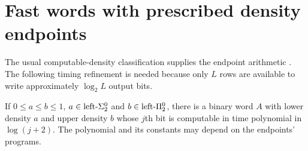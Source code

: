 \section{Fast words with prescribed density endpoints}\label{sec:words}
The usual computable-density classification supplies the endpoint
arithmetic \cite{density}. The following timing refinement is needed
because only $L$ rows are available to write approximately $\log_2 L$
output bits.

\begin{lemma}\label{lem:word}
If $0\leq a\leq b\leq1$, $a\in\text{left-}\Sigma^0_2$ and $b\in\text{left-}\Pi^0_2$, there is a binary
word $A$ with lower density $a$ and upper density $b$ whose $j$th bit is
computable in time polynomial in $\log(j+2)$. The polynomial and its
constants may depend on the endpoints' programs.
\end{lemma}
